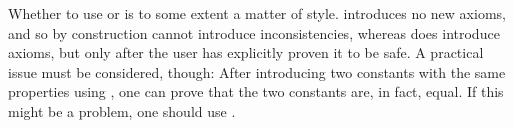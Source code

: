 \begin{isabellebody}
\begin{isamarkuptext}
\begin{description}
  \end{description}

  Whether to use \hyperlink{command.HOL.specification}{\mbox{}} or \hyperlink{command.HOL.ax-specification}{\mbox{}} is to some extent a matter of style.  \hyperlink{command.HOL.specification}{\mbox{}} introduces no new axioms, and so by
  construction cannot introduce inconsistencies, whereas \hyperlink{command.HOL.ax-specification}{\mbox{}} does introduce axioms, but only after the
  user has explicitly proven it to be safe.  A practical issue must be
  considered, though: After introducing two constants with the same
  properties using \hyperlink{command.HOL.specification}{\mbox{}}, one can prove
  that the two constants are, in fact, equal.  If this might be a
  problem, one should use \hyperlink{command.HOL.ax-specification}{\mbox{}}.%
\end{isamarkuptext}%
\isamarkuptrue%
%
\isadelimtheory
%
\endisadelimtheory
%
\isatagtheory
{}\isamarkupfalse%
%
\endisatagtheory
{\isafoldtheory}%
%
\isadelimtheory
%
\endisadelimtheory
\isanewline
\end{isabellebody}%

